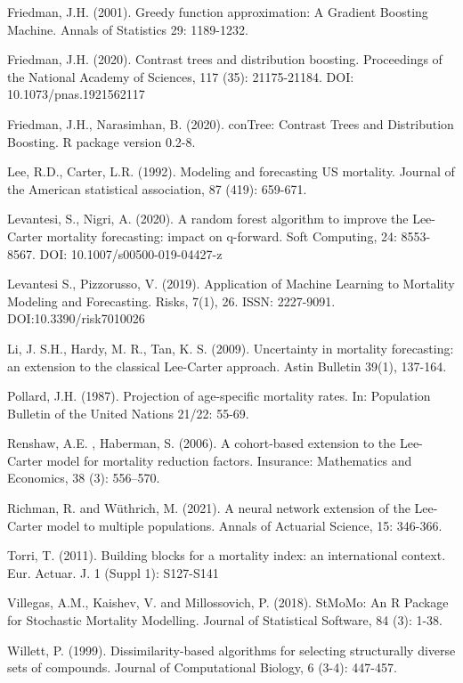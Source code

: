 \documentclass[fleqn,10pt]{wlscirep}
\begin{document}
\begin{thebibliography}{99}
Friedman, J.H. (2001). Greedy function approximation: A Gradient Boosting Machine. Annals of Statistics 29: 1189-1232.

Friedman, J.H. (2020). Contrast trees and distribution boosting. Proceedings of the National Academy of Sciences, 117 (35): 21175-21184. DOI: 10.1073/pnas.1921562117

Friedman, J.H., Narasimhan, B. (2020). conTree: Contrast Trees and Distribution Boosting. R package version 0.2-8.

Lee, R.D., Carter, L.R. (1992). Modeling and forecasting US mortality. Journal of the American statistical association, 87 (419): 659-671.

Levantesi, S., Nigri, A. (2020). A random forest algorithm to improve the Lee-Carter mortality forecasting: impact on q-forward. Soft Computing, 24: 8553-8567. DOI: 10.1007/s00500-019-04427-z

Levantesi S., Pizzorusso, V. (2019). Application of Machine Learning to Mortality Modeling and Forecasting. Risks, 7(1), 26. ISSN: 2227-9091. DOI:10.3390/risk7010026

Li, J. S.H.,  Hardy, M. R., Tan, K. S. (2009). Uncertainty in mortality forecasting: an extension to the classical Lee-Carter approach. Astin Bulletin 39(1), 137-164.

Pollard, J.H. (1987). Projection of age-specific mortality rates. In: Population Bulletin of the United Nations 21/22: 55-69.

Renshaw, A.E. , Haberman, S. (2006). A cohort-based extension to the Lee-Carter model for mortality reduction factors. Insurance: Mathematics and Economics, 38 (3): 556–570.

Richman, R. and W\"uthrich, M. (2021). A neural network extension of the Lee-Carter model to multiple populations. Annals of Actuarial Science, 15: 346-366.

Torri, T. (2011). Building blocks for a mortality index: an international context. Eur. Actuar. J. 1 (Suppl 1): S127-S141

Villegas, A.M., Kaishev, V. and Millossovich, P. (2018). StMoMo: An R Package for Stochastic Mortality Modelling. Journal of Statistical Software, 84 (3): 1-38.

Willett, P. (1999). Dissimilarity-based algorithms for selecting structurally diverse sets of compounds. Journal of Computational Biology, 6 (3-4): 447-457.
 
\end{thebibliography}
\end{document}
